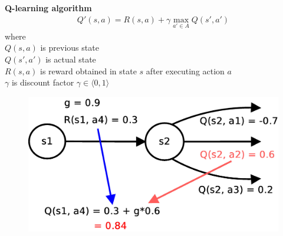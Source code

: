 \documentclass[xcolor=dvipsnames]{beamer}
\begin{document}
\begin{frame}{\bf Q-learning algorithm}
\begin{align*}
Q'(s, a) = R(s, a) + \gamma \max_{a' \in A}Q(s', a')
\end{align*}
where \\
$Q(s, a)$ is previous state \\
$Q(s', a')$ is actual state \\
$R(s, a)$ is reward obtained in state $s$ after executing action $a$ \\
$\gamma$ is discount factor $\gamma \in \langle0, 1\rangle$ \\
\begin{figure}[htbp]
  \centering
  \includegraphics[scale=0.3]{../../diagrams/q_learning_detail.jpg}
\end{figure}



\end{frame}
\end{document}
